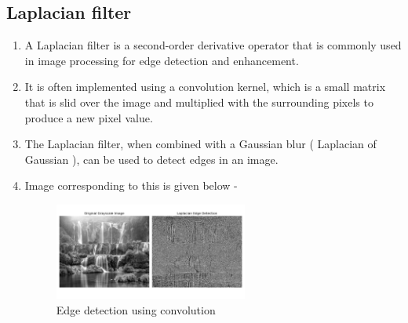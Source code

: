 \subsection{Laplacian filter}
\begin{enumerate}
\item A Laplacian filter is a second-order derivative operator that is commonly used in image processing for edge detection and enhancement.
\item It is often implemented using a convolution kernel, which is a small matrix that is slid over the image and multiplied with the surrounding pixels to produce a new pixel value.
\item The Laplacian filter, when combined with a Gaussian blur ( Laplacian of Gaussian ), can be used to detect edges in an image.
\item Image corresponding to this is given below - \\
\begin{figure}[h]
    \centering
    \includegraphics[width=0.6\textwidth]{figs/laplace.png}
    \caption{Edge detection using convolution}
    \label{fig:laplace}
\end{figure}
\end{enumerate}
